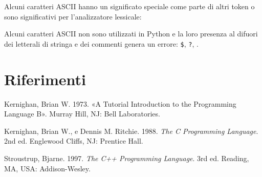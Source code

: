\documentclass[
  letterpaper,
  DIV=11,
  numbers=noendperiod]{scrreprt}
\newcommand{\VERB}{\Verb[commandchars=\\\{\}]}
\newcommand{\CommentTok}[1]{\textcolor[rgb]{0.37,0.37,0.37}{#1}}
\newcommand{\OperatorTok}[1]{\textcolor[rgb]{0.37,0.37,0.37}{#1}}
\newlength{\cslhangindent}
\newenvironment{CSLReferences}[2] %
 {\begin{list}{}{%
  \setlength{\itemindent}{0pt}
  \setlength{\leftmargin}{0pt}
  \setlength{\parsep}{0pt}
  \ifodd #1
   \setlength{\leftmargin}{\cslhangindent}
   \setlength{\itemindent}{-1\cslhangindent}
  \fi
  \setlength{\itemsep}{#2\baselineskip}}}
 {\end{list}}
\begin{document}
Alcuni caratteri ASCII hanno un significato speciale come parte di altri
token o sono significativi per l'analizzatore lessicale:


Alcuni caratteri ASCII non sono utilizzati in Python e la loro presenza
al difuori dei letterali di stringa e dei commenti genera un errore:
\texttt{\$}, \texttt{?}, \texttt{\textasciigrave{}}.

\cleardoublepage
{}
{}
\appendix

\chapter*{Riferimenti}\label{riferimenti}


\label{refs}
\begin{CSLReferences}{1}{0}
Kernighan, Brian W. 1973. {«A Tutorial Introduction to the Programming
Language B»}. Murray Hill, NJ: Bell Laboratories.

Kernighan, Brian W., e Dennis M. Ritchie. 1988. \emph{The C Programming
Language}. 2nd ed. Englewood Cliffs, NJ: Prentice Hall.

Stroustrup, Bjarne. 1997. \emph{The C++ Programming Language}. 3rd ed.
Reading, MA, USA: Addison-Wesley.

\end{CSLReferences}
\end{document}
